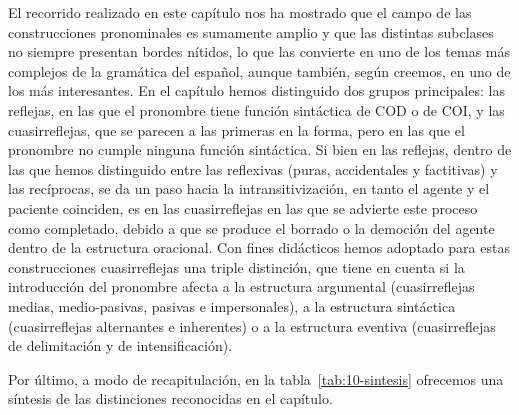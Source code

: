 \begin{recuadro}
El recorrido realizado en este capítulo nos ha mostrado que el campo de las
construcciones pronominales es sumamente amplio y que las distintas subclases no
siempre presentan bordes nítidos, lo que las convierte en uno de los temas más
complejos de la gramática del español, aunque también, según creemos, en uno de
los más interesantes. En el capítulo hemos distinguido dos grupos principales:
las reflejas, en las que el pronombre tiene función sintáctica de COD o de
COI, y las cuasirreflejas, que se
parecen a las primeras en la forma, pero en las que el pronombre no cumple
ninguna función sintáctica. Si bien en las reflejas, dentro de las que hemos
distinguido entre las reflexivas (puras, accidentales y factitivas) y las
recíprocas, se da un paso hacia la intransitivización, en tanto el agente y el
paciente coinciden, es en las cuasirreflejas en las que se advierte este proceso
como completado, debido a que se produce el borrado o la democión del agente
dentro de la estructura oracional. Con fines didácticos hemos adoptado para estas
construcciones cuasirreflejas una triple distinción, que tiene en cuenta si la
introducción del pronombre afecta a la estructura argumental (cuasirreflejas
medias, medio-pasivas, pasivas e impersonales), a la estructura sintáctica
(cuasirreflejas alternantes e inherentes) o a la estructura eventiva
(cuasirreflejas de delimitación y de intensificación).
\end{recuadro}

Por último, a modo de recapitulación, en la tabla~\ref{tab:10-sintesis} ofrecemos
una síntesis de las distinciones reconocidas en el capítulo.

